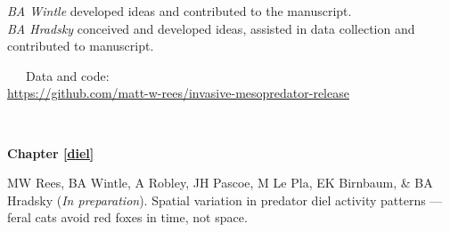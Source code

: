 \documentclass[11pt,a4paper,titlepage,twoside,openright]{style/unimelbthesis}
\begin{document}
\begin{frontmatter}
\begin{preface}
    \hspace*{0.333em}\hspace*{0.333em}\hspace*{0.333em}\hspace*{0.333em}\hspace*{0.333em}\hspace*{0.333em}\hspace*{0.333em}\hspace*{0.333em}\emph{BA Wintle} developed ideas and contributed to the manuscript.\\
    \hspace*{0.333em}\hspace*{0.333em}\hspace*{0.333em}\hspace*{0.333em}\hspace*{0.333em}\hspace*{0.333em}\hspace*{0.333em}\hspace*{0.333em}\emph{BA Hradsky} conceived and developed ideas, assisted in data collection and contributed to manuscript.
    
    ~~~Data and code:\\
    \url{https://github.com/matt-w-rees/invasive-mesopredator-release}
    
    \(~\)
    
    \textbf{Chapter \ref{diel}}
    
    MW Rees, BA Wintle, A Robley, JH Pascoe, M Le Pla, EK Birnbaum, \& BA Hradsky (\emph{In preparation}). Spatial variation in predator diel activity patterns --- feral cats avoid red foxes in time, not space.
    

\end{preface}
\end{frontmatter}
\end{document}
